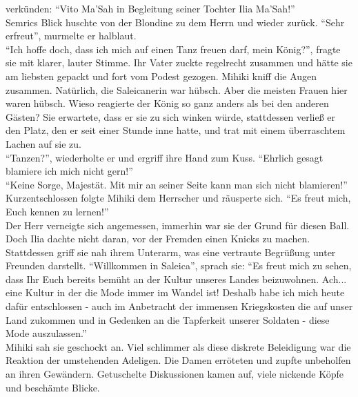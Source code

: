 verkünden: ``Vito Ma'Sah in Begleitung seiner Tochter Ilia Ma'Sah!''\\
Semrics Blick huschte von der Blondine zu dem Herrn und wieder zurück. ``Sehr erfreut'', murmelte 
er halblaut.\\
``Ich hoffe doch, dass ich mich auf einen Tanz freuen darf, mein König?'', fragte sie mit klarer, 
lauter Stimme. Ihr Vater zuckte regelrecht zusammen und hätte sie am liebsten gepackt und fort vom 
Podest gezogen. Mihiki kniff die Augen zusammen. Natürlich, die Saleicanerin war hübsch. Aber die 
meisten Frauen hier waren hübsch. Wieso reagierte der König so ganz anders als bei den anderen 
Gästen? Sie erwartete, dass er sie zu sich winken würde, stattdessen verließ er den Platz, den er 
seit einer Stunde inne hatte, und trat mit einem überraschtem Lachen auf sie zu.\\
``Tanzen?'', wiederholte er und ergriff ihre Hand zum Kuss. ``Ehrlich gesagt blamiere ich mich 
nicht gern!''\\
``Keine Sorge, Majestät. Mit mir an seiner Seite kann man sich nicht blamieren!''\\
Kurzentschlossen folgte Mihiki dem Herrscher und räusperte sich. ``Es freut mich, Euch kennen zu 
lernen!''\\
Der Herr verneigte sich angemessen, immerhin war sie der Grund für diesen Ball. Doch Ilia dachte 
nicht daran, vor der Fremden einen Knicks zu machen. Stattdessen griff sie nah ihrem Unterarm, was 
eine vertraute Begrüßung unter Freunden darstellt. ``Willkommen in Saleica'', sprach sie: ``Es 
freut mich zu sehen, dass Ihr Euch bereits bemüht an der Kultur unseres Landes beizuwohnen. Ach... 
eine Kultur in der die Mode immer im Wandel ist! Deshalb habe ich mich heute dafür entschlossen - 
auch im Anbetracht der immensen Kriegskosten die auf unser Land zukommen und in Gedenken an die 
Tapferkeit unserer Soldaten - diese Mode auszulassen.''\\
Mihiki sah sie geschockt an. Viel schlimmer als diese diskrete Beleidigung war die Reaktion der 
umstehenden Adeligen. Die Damen erröteten und zupfte unbeholfen an ihren Gewändern. Getuschelte 
Diskussionen kamen auf, viele nickende Köpfe und beschämte Blicke. 

